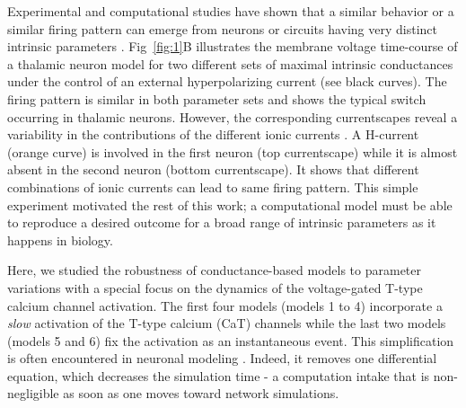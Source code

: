 Experimental and computational studies have shown that a similar behavior or a similar firing pattern can emerge from neurons or circuits having very distinct intrinsic parameters 
\citep{alonso_visualization_2019, goldman_dependence_2000, marder_modeling_2002}. Fig~\ref{fig:1}B illustrates the membrane voltage time-course of a thalamic neuron model for two different sets of maximal intrinsic conductances under the control of an external hyperpolarizing current (see black curves). The firing pattern is similar in both parameter sets and shows the typical switch occurring in thalamic neurons. However, the corresponding currentscapes reveal a variability in the contributions of the different ionic currents \citep{alonso_visualization_2019}. A H-current (orange curve) is involved in the first neuron (top currentscape) while it is almost absent in the second neuron (bottom currentscape).  It shows that different combinations of ionic currents can lead to same firing pattern.  This simple experiment motivated the rest of this work; a computational model must be able to reproduce a desired outcome for a broad range of intrinsic parameters as it happens in biology.

Here, we studied the robustness of conductance-based models to parameter variations  with a special focus on the dynamics of the voltage-gated T-type calcium channel activation. The first four models (models 1 to 4) incorporate a \textit{slow} activation of the T-type calcium (CaT) channels while the last two models (models 5 and 6) fix the activation as an instantaneous event. This simplification is often encountered in neuronal modeling \citep{wang_multiple_1994, rush_analysis_1994, pospischil_minimal_2008, kubota_nmda-induced_2011, rubin_high_2004, smith_fourier_2000, amarillo_analysis_2015, golomb_synchronization_1994}. Indeed, it removes one differential equation, which decreases the simulation time - a computation intake that is non-negligible as soon as one moves toward network simulations. 



